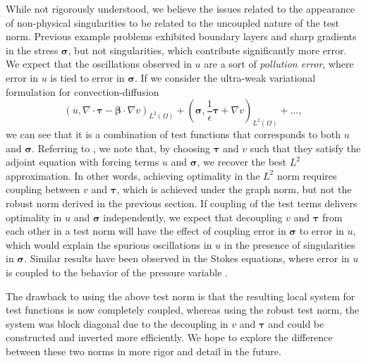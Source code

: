 \documentclass[letterpaper]{article}
\def\btau{\boldsymbol\tau}
\def\bfsigma{\boldsymbol\sigma}
\def\bbeta{\boldsymbol\beta}
\newcommand{\LRp}[1]{\left( #1 \right)}
\renewcommand{\L}{L^2\LRp{\Omega}}
\newcommand{\grad}{\nabla}
\renewcommand{\div}{\grad \cdot}
\begin{document}
While not rigorously understood, we believe the issues related to the
appearance of non-physical singularities to be related to the uncoupled nature
of the test norm.  Previous example problems exhibited boundary layers and
sharp gradients in the stress $\bfsigma$, but not singularities, which
contribute significantly more error.  We expect that the oscillations observed
in $u$ are a sort of \textit{pollution error}, where error in $u$ is tied to
error in $\bfsigma$.  If we consider the ultra-weak variational formulation for
convection-diffusion
\[
\LRp{u,\div \btau - \bbeta\cdot \grad v}_{\L} + \LRp{\bfsigma,\frac{1}{\epsilon}
\btau + \grad v}_{\L} + \ldots,
\]
we can see that it is a combination of test functions that corresponds to both
$u$ and $\bfsigma$.  Referring to \cite{ChanHeuerThanhDemkowicz2012}, we note
that, by choosing $\btau$
and $v$ such that they satisfy the adjoint equation with forcing terms $u$ and
$\bfsigma$, we recover the best $L^2$ approximation.  In other words, achieving
optimality in the $L^2$ norm requires coupling between $v$ and $\btau$, which
is achieved under the graph norm, but not the robust norm derived in the
previous section.
If coupling of the test terms delivers optimality in $u$ and $\bfsigma$
independently, we expect that decoupling
$v$ and $\btau$ from each other in a test norm will have the
effect of coupling error in $\bfsigma$ to error in $u$, which would explain the
spurious oscillations in $u$ in the presence of singularities in $\bfsigma$.
Similar results have been observed in the Stokes equations, where error in $u$
is coupled to the behavior of the pressure variable \cite{FLD:FLD582}.

The drawback to using the above test norm is that the resulting local system
for test functions is now completely coupled, whereas using the robust test
norm, the system was block diagonal due to the decoupling in $v$ and $\btau$
and could be constructed and inverted more efficiently.  We hope to explore
the difference between these two norms in more rigor and detail in the
future.
\end{document}

